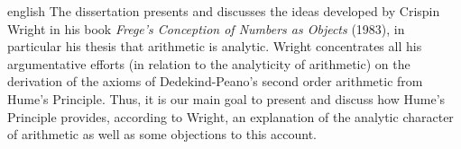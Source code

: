 \documentclass[diss]{UFRuralRJ}
\begin{document}
\begin{generalabstract}{english}{\tituloingles}{\chavesingles} %
  The dissertation presents and discusses the ideas developed by Crispin Wright
  in his book \textit{Frege's Conception of Numbers as Objects} (1983), in 
  particular his thesis that arithmetic is analytic. Wright concentrates all 
  his argumentative efforts (in relation to the analyticity of arithmetic) on 
  the derivation of the axioms of Dedekind-Peano's second order arithmetic from
  Hume's Principle. Thus, it is our main goal to present and discuss how Hume's 
  Principle provides, according to Wright, an explanation of the analytic 
  character of arithmetic as well as some objections to this account.
\end{generalabstract}





\tableofcontents %


\setlength{\baselineskip}{1.5\baselineskip}
\setlength{\baselineskip}{\baselineskip}
\end{document}
